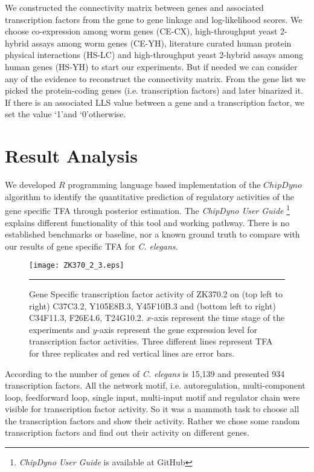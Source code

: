 We constructed the connectivity matrix between genes and associated transcription factors from the gene to gene linkage and log-likelihood scores. We choose co-expression among worm genes (CE-CX), high-throughput yeast 2-hybrid assays among worm genes (CE-YH), literature curated human protein physical interactions (HS-LC) and high-throughput yeast 2-hybrid assays among human genes (HS-YH) to start our experiments. But if needed we can consider any of the evidence to reconstruct the connectivity matrix. From the gene list we picked the protein-coding genes (i.e. transcription factors) and later binarized it. If there is an associated LLS value between a gene and a transcription factor, we set the value \lq 1\rq and \lq 0\rq otherwise.

\section{Result Analysis}
We developed $R$ programming language based implementation of the $ChipDyno$ algorithm to identify the quantitative prediction of regulatory activities of the gene specific TFA through posterior estimation. The \textit{ChipDyno User Guide} \footnote{\textit{ChipDyno User Guide} is available at GitHub} explains different functionality of this tool and working pathway. There is no established benchmarks or baseline, nor a known ground truth to compare with our results of gene specific TFA for \textit{C. elegans}.

\begin{figure}
	\centering
		\texttt{[image: ZK370\_2\_3.eps]}
		\rule{35em}{0.5pt}
	\caption[Gene Specific transcription factor activity of ZK370.2]
		{Gene Specific transcription factor activity of ZK370.2 on (top left to right) C37C3.2, Y105E8B.3, Y45F10B.3 and (bottom left to right) C34F11.3, F26E4.6, T24G10.2. $x$-axis represent the time stage of the experiments and $y$-axis represent the gene expression level for transcription factor activities. Three different lines represent TFA for three replicates and red vertical lines are error bars.}
	\label{fig:TFA_of_of_ZK370.2}
\end{figure}

According to \cite{WormNet} the number of genes of \textit{C. elegans} is 15,139 and \cite{Inmaculada:2007} presented 934 transcription factors. All the network motif, i.e. autoregulation, multi-component loop, feedforward loop, single input, multi-input motif and regulator chain were visible for transcription factor activity. So it was a mammoth task to choose all the transcription factors and show their activity. Rather we chose some random transcription factors and find out their activity on different genes.


